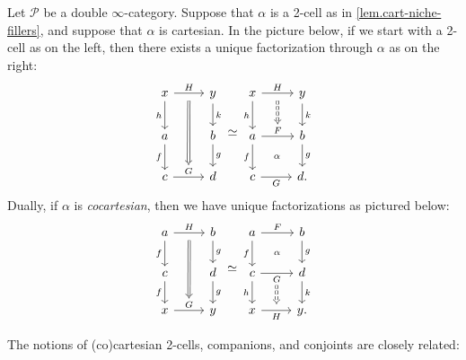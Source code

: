 \documentclass[a4paper, 11pt]{amsart}
\numberwithin{theorem}{section}
\theoremstyle{definition}
\renewcommand{\P}{\mathscr{P}}
\begin{document}
\begin{remark}\label{rem.cart-fact}
	Let $\P$ be a double $\infty$-category.
	Suppose that $\alpha$ is a 2-cell as in \cref{lem.cart-niche-fillers}, and suppose that $\alpha$ is cartesian.
	In the picture below, if we start with a 2-cell as on the left, then there exists a unique factorization through $\alpha$ as on the right: 
	\[
	\begin{tikzcd} 
		x \arrow[d,"h"'] \arrow[r,"H"name=h1] & y \arrow[d,"k"] \\
		a \arrow[d,"f"'] & b \arrow[d, "g"] \\ 
		c \arrow[r, "G"name=h2] & d
		\arrow[from=h1,to=h2,Rightarrow, shorten <= 6pt]
	\end{tikzcd}
	\simeq 
	\begin{tikzcd} 
		x \arrow[d,"h"'] \arrow[r,"H"name=h1] & y \arrow[d,"k"] \\
		a \arrow[r,"F"name=h2]\arrow[d,"f"'] & b \arrow[d, "g"] \\ 
		c \arrow[r, "G"'name=h3] & d.
		\arrow[from=h1,to=h2, Rightarrow, dashed, shorten <= 6pt]
		\arrow[from=h2,to=h3,phantom,"\scriptstyle \alpha"]
	\end{tikzcd}
	\]
	Dually, if $\alpha$ is \textit{cocartesian}, then we have unique factorizations as pictured below: 
	\[
	\begin{tikzcd} 
		a \arrow[d,"f"'] \arrow[r,"H"name=h1] & b \arrow[d,"g"] \\
		c \arrow[d,"f"'] & d \arrow[d, "g"] \\ 
		x \arrow[r, "G"name=h2] & y
		\arrow[from=h1,to=h2,Rightarrow, shorten <= 6pt]
	\end{tikzcd}
	\simeq 
	\begin{tikzcd} 
		a \arrow[d,"f"'] \arrow[r,"F"name=h1] & b \arrow[d,"g"] \\
		c \arrow[r,"G"'name=h2]\arrow[d,"h"'] & d \arrow[d, "k"] \\ 
		x \arrow[r, "H"'name=h3] & y.
		\arrow[from=h2,to=h3, Rightarrow, dashed, shorten >= 5pt]
		\arrow[from=h1,to=h2,phantom,"\scriptstyle \alpha"]
	\end{tikzcd}
	\]
\end{remark}


The notions of (co)cartesian 2-cells, companions, and conjoints are closely related:
\end{document}
